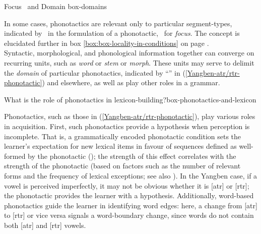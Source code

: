 \largerpage
\begin{dadpbox}{Focus \tier\ and Domain \dom}{box-domains}

In some cases, phonotactics are relevant only to particular segment-types, indicated by \tier\ in the formulation of a phonotactic, \tier\ for \textit{focus}. The concept is elucidated further in box \ref{box:box-locality-in-conditions} on page \pageref{box:box-locality-in-conditions}.\\

Syntactic, morphological, and phonological information together can converge on recurring units, such as \textit{word} or \textit{stem} or \textit{morph}. These units may serve to delimit the \textit{domain} of particular phonotactics, indicated by ``\dom'' in (\ref{Yangben-atr/rtr-phonotactic}) and elsewhere, as well as play other roles in a grammar. 
\end{dadpbox}

\begin{dadpbox}{What is the role of phonotactics in lexicon-building?}{box-phonotactics-and-lexicon}

Phonotactics, such as those in (\ref{Yangben-atr/rtr-phonotactic}), play various roles in acquisition. First, such phonotactics  provide a hypothesis when perception is incomplete. That is, a grammatically encoded phonotactic condition sets the learner's expectation for new lexical items in favour of sequences defined as well-formed by the phonotactic (\citealt{Moore-Cantwell:2016}); the strength of this effect correlates with the strength of the phonotactic (based on factors such as the number of relevant forms and the frequency of lexical exceptions; see also \citealt{Yang:2016}).  In the Yangben case, if a vowel is perceived imperfectly, it may not be obvious whether it is [atr] or [rtr]; the phonotactic provides the learner with a hypothesis. Additionally, word-based phonotactics guide the learner in identifying word edges: here, a change from [atr] to [rtr] or vice versa signals a word-boundary change, since words do not contain both [atr] and [rtr] vowels. 
\end{dadpbox}


